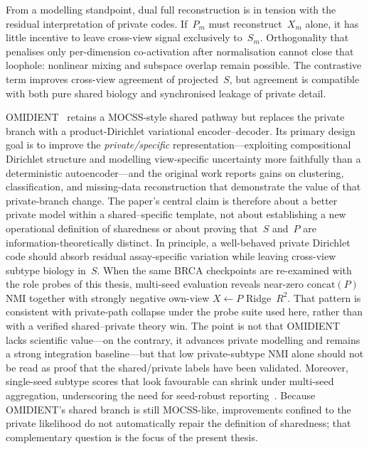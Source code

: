 From a modelling standpoint, dual full reconstruction is in tension with the residual interpretation of private codes. If~$P_m$ must reconstruct~$X_m$ alone, it has little incentive to leave cross-view signal exclusively to~$S_m$. Orthogonality that penalises only per-dimension co-activation after normalisation cannot close that loophole: nonlinear mixing and subspace overlap remain possible. The contrastive term improves cross-view agreement of projected~$S$, but agreement is compatible with both pure shared biology and synchronised leakage of private detail.

OMIDIENT~\citep{Safinianaini_Välimäki_Bresson_Gorbonos_Rajamäki_Aaltonen_Marttinen_2025} retains a MOCSS-style shared pathway but replaces the private branch with a product-Dirichlet variational encoder--decoder. Its primary design goal is to improve the \emph{private/specific} representation---exploiting compositional Dirichlet structure and modelling view-specific uncertainty more faithfully than a deterministic autoencoder---and the original work reports gains on clustering, classification, and missing-data reconstruction that demonstrate the value of that private-branch change. The paper's central claim is therefore about a better private model within a shared--specific template, not about establishing a new operational definition of sharedness or about proving that~$S$ and~$P$ are information-theoretically distinct. In principle, a well-behaved private Dirichlet code should absorb residual assay-specific variation while leaving cross-view subtype biology in~$S$. When the same BRCA checkpoints are re-examined with the role probes of this thesis, multi-seed evaluation reveals near-zero $\mathrm{concat}(P)$ NMI together with strongly negative own-view $X\leftarrow P$ Ridge~$R^{2}$. That pattern is consistent with private-path collapse under the probe suite used here, rather than with a verified shared--private theory win. The point is not that OMIDIENT lacks scientific value---on the contrary, it advances private modelling and remains a strong integration baseline---but that low private-subtype NMI alone should not be read as proof that the shared/private labels have been validated. Moreover, single-seed subtype scores that look favourable can shrink under multi-seed aggregation, underscoring the need for seed-robust reporting~\citep{baiao2025technical}. Because OMIDIENT's shared branch is still MOCSS-like, improvements confined to the private likelihood do not automatically repair the definition of sharedness; that complementary question is the focus of the present thesis.

